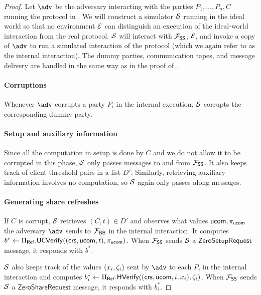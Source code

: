 \begin{proof}
    Let $\adv$ be the adversary interacting with the parties $P_1, \dots, P_n, C$ running the protocol in . We will construct a simulator $\mathcal{S}$ running in the ideal world so that no environment $\mathcal{E}$ can distinguish an execution of the ideal-world interaction from the real protocol. $\mathcal{S}$ will interact with $\mathcal{F}_\mathsf{SS}$, $\mathcal{E}$, and invoke a copy of $\adv$ to run a simulated interaction of the protocol (which we again refer to as the internal interaction). The dummy parties, communication tapes, and message delivery are handled in the same way as in the proof of .
    
    \paragraph{Corruptions} Whenever $\adv$ corrupts a party $P_i$ in the internal execution, $\mathcal{S}$ corrupts the corresponding dummy party.

    \paragraph{Setup and auxiliary information} Since all the computation in setup is done by $C$ and we do not allow it to be corrupted in this phase, $\mathcal{S}$ only passes messages to and from $\mathcal{F}_\mathsf{SS}$. It also keeps track of client-threshold pairs in a list $D'$. Similarly, retrieving auxiliary information involves no computation, so $\mathcal{S}$ again only passes along messages.

    \paragraph{Generating share refreshes} If $C$ is corrupt, $\mathcal{S}$ retrieves $(C, t) \in D'$ and observes what values $\mathsf{ucom}, \pi_{\mathsf{ucom}}$ the adversary $\adv$ sends to $\mathcal{F}_\mathsf{BB}$ in the internal interaction. It computes $b^* \gets \Pi_{\sf Ref}.\mathsf{UC}\mathsf{Verify}((\mathsf{crs}, \mathsf{ucom}, t), \pi_{\mathsf{ucom}})$. When $\mathcal{F}_\mathsf{SS}$ sends $\mathcal{S}$ a $\mathsf{ZeroSetupRequest}$ message, it responds with $b^*$.

    $\mathcal{S}$ also keeps track of the values $(x_i, \zeta_i)$ sent by $\adv$ to each $P_i$ in the internal interaction and computes $b_i^* \gets \Pi_{\sf Ref}.\mathsf{H}\mathsf{Verify}((\mathsf{crs}, \mathsf{ucom}, i, x_i), \zeta_i)$. When $\mathcal{F}_\mathsf{SS}$ sends $\mathcal{S}$ a $\mathsf{ZeroShareRequest}$ message, it responds with $b_i^*$.
\end{proof}